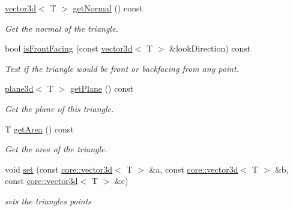 \begin{DoxyCompactItemize}
\hyperlink{classirr_1_1core_1_1vector3d}{vector3d}$<$ T $>$ \hyperlink{classirr_1_1core_1_1triangle3d_a14298103d89ba5eae37d82d8556f07e2}{get\+Normal} () const 
\begin{DoxyCompactList}\small\item\em Get the normal of the triangle. \end{DoxyCompactList}\item 
bool \hyperlink{classirr_1_1core_1_1triangle3d_acec0805b8512d9c3b0d5fe4b2cdb8562}{is\+Front\+Facing} (const \hyperlink{classirr_1_1core_1_1vector3d}{vector3d}$<$ T $>$ \&look\+Direction) const 
\begin{DoxyCompactList}\small\item\em Test if the triangle would be front or backfacing from any point. \end{DoxyCompactList}\item 
\hyperlink{classirr_1_1core_1_1plane3d}{plane3d}$<$ T $>$ \hyperlink{classirr_1_1core_1_1triangle3d_a8cec7cdb0c9caa0b41f819eac2ad51aa}{get\+Plane} () const \hypertarget{classirr_1_1core_1_1triangle3d_a8cec7cdb0c9caa0b41f819eac2ad51aa}{}\label{classirr_1_1core_1_1triangle3d_a8cec7cdb0c9caa0b41f819eac2ad51aa}

\begin{DoxyCompactList}\small\item\em Get the plane of this triangle. \end{DoxyCompactList}\item 
T \hyperlink{classirr_1_1core_1_1triangle3d_a2394228f2da6063eb8fedf1f3da9facc}{get\+Area} () const \hypertarget{classirr_1_1core_1_1triangle3d_a2394228f2da6063eb8fedf1f3da9facc}{}\label{classirr_1_1core_1_1triangle3d_a2394228f2da6063eb8fedf1f3da9facc}

\begin{DoxyCompactList}\small\item\em Get the area of the triangle. \end{DoxyCompactList}\item 
void \hyperlink{classirr_1_1core_1_1triangle3d_aebcd3f29fcbf9008dac95810c81f152c}{set} (const \hyperlink{classirr_1_1core_1_1vector3d}{core\+::vector3d}$<$ T $>$ \&a, const \hyperlink{classirr_1_1core_1_1vector3d}{core\+::vector3d}$<$ T $>$ \&b, const \hyperlink{classirr_1_1core_1_1vector3d}{core\+::vector3d}$<$ T $>$ \&c)\hypertarget{classirr_1_1core_1_1triangle3d_aebcd3f29fcbf9008dac95810c81f152c}{}\label{classirr_1_1core_1_1triangle3d_aebcd3f29fcbf9008dac95810c81f152c}

\begin{DoxyCompactList}\small\item\em sets the triangle\textquotesingle{}s points \end{DoxyCompactList}\end{DoxyCompactItemize}
